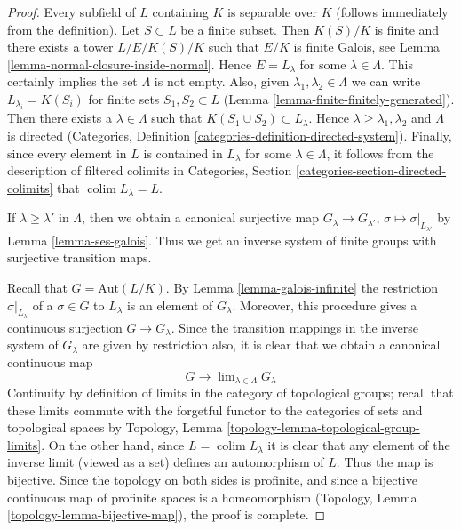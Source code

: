 \documentclass{stacks-project}
\theoremstyle{plain}
\theoremstyle{definition}
\theoremstyle{remark}
\numberwithin{equation}{subsection}
\def\lim{\mathop{\mathrm{lim}}\nolimits}
\def\colim{\mathop{\mathrm{colim}}\nolimits}
\begin{document}
\begin{proof}
Every subfield of $L$ containing $K$ is separable over $K$
(follows immediately from the definition). Let $S \subset L$
be a finite subset. Then $K(S)/K$ is finite and there exists
a tower $L/E/K(S)/K$ such that $E/K$ is finite Galois, see
Lemma \ref{lemma-normal-closure-inside-normal}.
Hence $E = L_\lambda$ for some $\lambda \in \Lambda$.
This certainly implies the set $\Lambda$ is not empty.
Also, given $\lambda_1, \lambda_2 \in \Lambda$ we can
write $L_{\lambda_i} = K(S_i)$ for finite sets
$S_1, S_2 \subset L$ (Lemma \ref{lemma-finite-finitely-generated}).
Then there exists a $\lambda \in \Lambda$ such that
$K(S_1 \cup S_2) \subset L_\lambda$. Hence
$\lambda \geq \lambda_1, \lambda_2$ and
$\Lambda$ is directed (Categories, Definition
\ref{categories-definition-directed-system}).
Finally, since every element in $L$ is contained in
$L_\lambda$ for some $\lambda \in \Lambda$, it follows
from the description of filtered colimits in
Categories, Section \ref{categories-section-directed-colimits}
that $\colim L_\lambda = L$.

\medskip\noindent
If $\lambda \geq \lambda'$ in $\Lambda$, then we obtain a
canonical surjective map $G_\lambda \to G_{\lambda'}$,
$\sigma \mapsto \sigma|_{L_{\lambda'}}$
by Lemma \ref{lemma-ses-galois}. Thus we get an inverse
system of finite groups with surjective transition maps.

\medskip\noindent
Recall that $G = \text{Aut}(L/K)$. By Lemma \ref{lemma-galois-infinite}
the restriction $\sigma|_{L_\lambda}$ of a $\sigma \in G$ to $L_\lambda$
is an element of $G_\lambda$. Moreover, this procedure gives a continuous
surjection $G \to G_\lambda$. Since the transition mappings
in the inverse system of $G_\lambda$ are given by restriction
also, it is clear that we obtain a canonical continuous map
$$
G \longrightarrow \lim_{\lambda \in \Lambda} G_\lambda
$$
Continuity by definition of limits in the category of topological
groups; recall that these limits commute with the forgetful functor
to the categories of sets and topological spaces by
Topology, Lemma \ref{topology-lemma-topological-group-limits}.
On the other hand, since $L = \colim L_\lambda$ it is clear
that any element of the inverse limit (viewed as a set) defines an
automorphism of $L$. Thus the map is bijective. Since the topology
on both sides is profinite, and since a bijective continuous map
of profinite spaces is a homeomorphism
(Topology, Lemma \ref{topology-lemma-bijective-map}), the proof is complete.
\end{proof}
\end{document}
